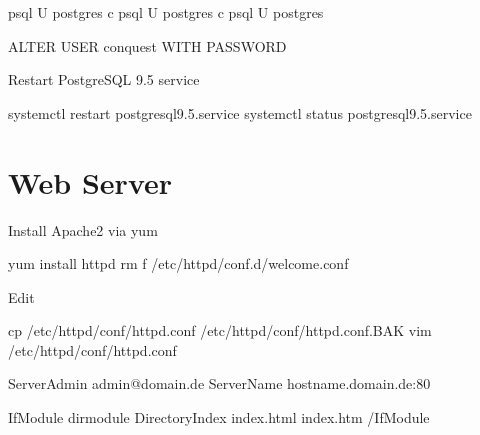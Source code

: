 \documentclass[letterpaper,10pt,english]{sphinxmanual}
\begin{document}
%
\begin{sphinxVerbatim}[commandchars=\\\{\}]
psql \PYGZhy{}U postgres \PYGZhy{}c 
psql \PYGZhy{}U postgres \PYGZhy{}c 
psql \PYGZhy{}U postgres

ALTER USER conquest WITH PASSWORD 
\end{sphinxVerbatim}

Restart PostgreSQL 9.5 service

%
\begin{sphinxVerbatim}[commandchars=\\\{\}]
systemctl restart postgresql\PYGZhy{}9.5.service
systemctl status postgresql\PYGZhy{}9.5.service
\end{sphinxVerbatim}


\section{Web Server}
\label{\detokenize{trl2:web-server}}
Install Apache2 via yum

%
\begin{sphinxVerbatim}[commandchars=\\\{\}]
yum install httpd
rm \PYGZhy{}f /etc/httpd/conf.d/welcome.conf
\end{sphinxVerbatim}

Edit 

%
\begin{sphinxVerbatim}[commandchars=\\\{\}]
cp /etc/httpd/conf/httpd.conf /etc/httpd/conf/httpd.conf.BAK
vim /etc/httpd/conf/httpd.conf
\end{sphinxVerbatim}

%
\begin{sphinxVerbatim}[commandchars=\\\{\}]
ServerAdmin admin@domain.de
ServerName hostname.domain.de:80

\PYGZlt{}IfModule dir\PYGZus{}module\PYGZgt{}
  DirectoryIndex index.html index.htm
\PYGZlt{}/IfModule\PYGZgt{}
\end{sphinxVerbatim}
\end{document}
